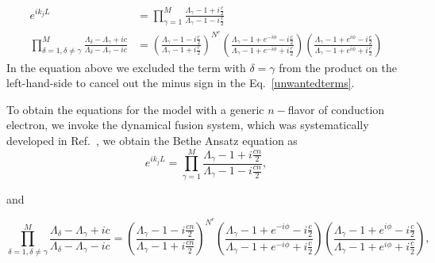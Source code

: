 \documentclass[aps,  prb,twocolumn,
  superscriptaddress,  floatfix,  10pt         
]{revtex4-2}
\begin{document}
\begin{align}
e^{i k_{j} L}&=\prod_{\gamma=1}^{M} \frac{\Lambda_{\gamma}-1+i\frac{c}{2}}{\Lambda_{\gamma}-1-i \frac{c}{2}}\label{CBAE}\\
\prod_{\delta=1, \delta\neq \gamma}^{M} \frac{\Lambda_{\delta}-\Lambda_{\gamma}+i c}{\Lambda_{\delta}-\Lambda_{\gamma}-i c}&=\left(\frac{\Lambda_{\gamma}-1-i \frac{c}{2}}{\Lambda_{\gamma}-1+i \frac{c}{2}}\right)^{N^{e}}\left(
\frac{\Lambda_{\gamma}-1+e^{-i\phi}-i\frac{c}{2}}
     {\Lambda_{\gamma}-1+e^{-i\phi}+i\frac{c}{2}}
\right)
\left(
\frac{\Lambda_{\gamma}-1+e^{i\phi}-i\frac{c}{2}}
     {\Lambda_{\gamma}-1+e^{i\phi}+i\frac{c}{2}}
\right)\label{SBAE}
\end{align}
In the equation above we excluded the term with $\delta=\gamma$ from the product on the left-hand-side to cancel out the minus sign in the Eq.~\eqref{unwantedterms}.

To obtain the equations for the model with a generic $n-$flavor of conduction electron, we invoke the dynamical fusion system, which was systematically developed in Ref.~\cite{andrei1984solution}, we obtain the Bethe Ansatz equation as
\begin{equation}
e^{i k_{j} L} =\prod_{\gamma=1}^{M} \frac{\Lambda_{\gamma}-1+i \frac{cn}{2}}
     {\Lambda_{\gamma}-1-i \frac{cn}{2}},\label{CBAE-multch}
\end{equation}

and 

\begin{equation}
    \prod_{\delta=1,\delta\neq\gamma}^{M}
\frac{\Lambda_{\delta}-\Lambda_{\gamma}+ic}
     {\Lambda_{\delta}-\Lambda_{\gamma}-ic}
=
\left(
\frac{\Lambda_{\gamma}-1-i\frac{cn}{2}}
     {\Lambda_{\gamma}-1+i\frac{cn}{2}}
\right)^{N^e}\left(
\frac{\Lambda_{\gamma}-1+e^{-i\phi}-i\frac{c}{2}}
     {\Lambda_{\gamma}-1+e^{-i\phi}+i\frac{c}{2}}
\right)
\left(
\frac{\Lambda_{\gamma}-1+e^{i\phi}-i\frac{c}{2}}
     {\Lambda_{\gamma}-1+e^{i\phi}+i\frac{c}{2}}
\right),\label{SBAE-multch}
\end{equation}
\end{document}
